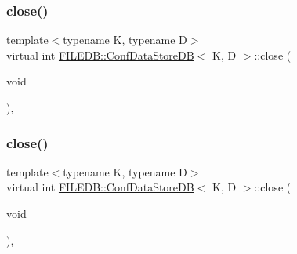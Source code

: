 \subsubsection{\texorpdfstring{close()}{close()}\hspace{0.1cm}{\footnotesize\ttfamily [1/2]}}
{\footnotesize\ttfamily template$<$typename K, typename D$>$ \\
virtual int \mbox{\hyperlink{classFILEDB_1_1ConfDataStoreDB}{F\+I\+L\+E\+D\+B\+::\+Conf\+Data\+Store\+DB}}$<$ K, D $>$\+::close (\begin{DoxyParamCaption}\item[{void}]{ }\end{DoxyParamCaption})\hspace{0.3cm}{\ttfamily [inline]}, {\ttfamily [virtual]}}

\mbox{\label{classFILEDB_1_1ConfDataStoreDB_aa322ea0136b8eacc11df2b5b52b3b6d5}} 
\subsubsection{\texorpdfstring{close()}{close()}\hspace{0.1cm}{\footnotesize\ttfamily [2/2]}}
{\footnotesize\ttfamily template$<$typename K, typename D$>$ \\
virtual int \mbox{\hyperlink{classFILEDB_1_1ConfDataStoreDB}{F\+I\+L\+E\+D\+B\+::\+Conf\+Data\+Store\+DB}}$<$ K, D $>$\+::close (\begin{DoxyParamCaption}\item[{void}]{ }\end{DoxyParamCaption})\hspace{0.3cm}{\ttfamily [inline]}, {\ttfamily [virtual]}}

